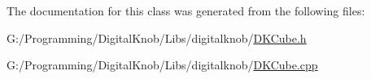 The documentation for this class was generated from the following files\-:\begin{DoxyCompactItemize}
\item 
G\-:/\-Programming/\-Digital\-Knob/\-Libs/digitalknob/\hyperlink{_d_k_cube_8h}{D\-K\-Cube.\-h}\item 
G\-:/\-Programming/\-Digital\-Knob/\-Libs/digitalknob/\hyperlink{_d_k_cube_8cpp}{D\-K\-Cube.\-cpp}\end{DoxyCompactItemize}

